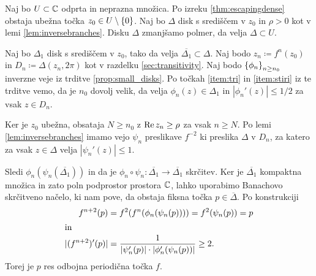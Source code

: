 \begin{dokaz}
    Naj bo \(U \subset \mathbb C\) odprta in neprazna množica. Po izreku \ref{thm:escapingdense} obstaja ubežna točka \(z_0 \in U \setminus \left\{ 0 \right\}\). Naj bo \(\Delta\) disk s središčem v \(z_0\) in \(\rho > 0\) kot v lemi \ref{lem:inversebranches}. Disku \(\Delta\) zmanjšamo polmer, da velja \(\Delta \subset U\).

    Naj bo \(\Delta_1\) disk s središčem v \(z_0\), tako da velja \(\overline{\Delta_1} \subset \Delta\). Naj bodo \(z_n \coloneq f^n (z_0)\) in \(D_n \coloneq \Delta (z_n, 2 \pi)\) kot v razdelku \ref{sec:transitivity}. Naj bodo \(\left\{ \phi_n \right\}_{n \geq n_0}\) inverzne veje iz trditve \ref{prop:small_disks}. Po točkah \ref{item:tri} in \ref{item:stiri} iz te trditve vemo, da je \(n_0\) dovolj velik, da velja \(\phi_n (z) \in \Delta_1\) in \(|\phi_n' (z)| \leq 1 / 2\) za vsak \(z \in D_n\).

    Ker je \(z_0\) ubežna, obsataja \(N \geq n_0\) z \(\operatorname{Re} z_n \geq \rho\) za vsak \(n \geq N\). Po lemi \ref{lem:inversebranches} imamo vejo \(\psi_n\) preslikave \(f^{-2}\) ki preslika \(\Delta\) v \(D_n\), za katero za vsak \(z \in \Delta\) velja \(|\psi_n' (z)| \leq 1\).
    
    Sledi \(\phi_n (\psi_n (\overline{\Delta_1}))\) in da je \(\phi_n \circ \psi_{n} \colon \overline{\Delta_1} \to \overline{\Delta_1}\) skrčitev. Ker je \(\overline{\Delta_1}\) kompaktna množica in zato poln podprostor prostora \(\mathbb C\), lahko uporabimo Banachovo skrčitveno načelo, ki nam pove, da obstaja fiksna točka \(p \in \overline{\Delta}\). Po konstrukciji
    \begin{align*}
        f^{n + 2} (p) &= f^2 (f^n (\phi_n (\psi_n (p)))) = f^2 (\psi_n (p)) = p\\
        \intertext{in}
        |(f^{n + 2})' (p)| &= \frac{1}{|\psi_n' (p)| \cdot |\phi_n' (\psi_n (p))|} \geq 2.
    \end{align*}
    Torej je \(p\) res odbojna periodična točka \(f\).
\end{dokaz}